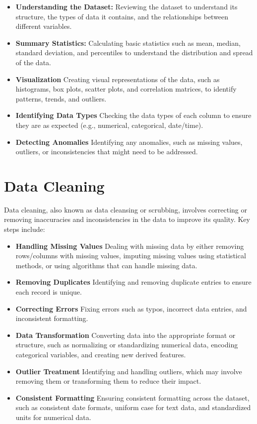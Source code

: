 \documentclass[
]{book}
\begin{document}
\begin{itemize}
\item
  \textbf{Understanding the Dataset:}
  Reviewing the dataset to understand its structure, the types of data it contains, and the relationships between different variables.
\item
  \textbf{Summary Statistics:}
  Calculating basic statistics such as mean, median, standard deviation, and percentiles to understand the distribution and spread of the data.
\item
  \textbf{Visualization}
  Creating visual representations of the data, such as histograms, box plots, scatter plots, and correlation matrices, to identify patterns, trends, and outliers.
\item
  \textbf{Identifying Data Types}
  Checking the data types of each column to ensure they are as expected (e.g., numerical, categorical, date/time).
\item
  \textbf{Detecting Anomalies}
  Identifying any anomalies, such as missing values, outliers, or inconsistencies that might need to be addressed.
\end{itemize}

\hypertarget{data-cleaning}{%
\section*{Data Cleaning}\label{data-cleaning}}

Data cleaning, also known as data cleansing or scrubbing, involves correcting or removing inaccuracies and inconsistencies in the data to improve its quality. Key steps include:

\begin{itemize}
\item
  \textbf{Handling Missing Values}
  Dealing with missing data by either removing rows/columns with missing values, imputing missing values using statistical methods, or using algorithms that can handle missing data.
\item
  \textbf{Removing Duplicates}
  Identifying and removing duplicate entries to ensure each record is unique.
\item
  \textbf{Correcting Errors}
  Fixing errors such as typos, incorrect data entries, and inconsistent formatting.
\item
  \textbf{Data Transformation}
  Converting data into the appropriate format or structure, such as normalizing or standardizing numerical data, encoding categorical variables, and creating new derived features.
\item
  \textbf{Outlier Treatment}
  Identifying and handling outliers, which may involve removing them or transforming them to reduce their impact.
\item
  \textbf{Consistent Formatting}
  Ensuring consistent formatting across the dataset, such as consistent date formats, uniform case for text data, and standardized units for numerical data.
\end{itemize}
\end{document}
